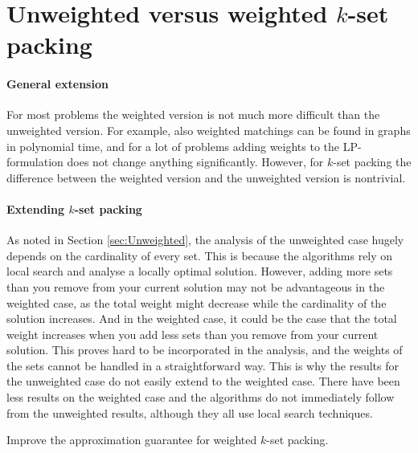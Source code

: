 \section{Unweighted versus weighted $k$-set packing}\label{sec:WeightedVSUnweighted}

\paragraph{General extension} For most problems the weighted version is not much more difficult than the unweighted version. For example, also weighted matchings can be found in graphs in polynomial time, and for a lot of problems adding weights to the LP-formulation does not change anything significantly. However, for $k$-set packing the difference between the weighted version and the unweighted version is nontrivial.

\paragraph{Extending $k$-set packing} As noted in Section \ref{sec:Unweighted}, the analysis of the unweighted case hugely depends on the cardinality of every set. This is because the algorithms rely on local search and analyse a locally optimal solution. However, adding more sets than you remove from your current solution may not be advantageous in the weighted case, as the total weight might decrease while the cardinality of the solution increases. And in the weighted case, it could be the case that the total weight increases when you add less sets than you remove from your current solution. This proves hard to be incorporated in the analysis, and the weights of the sets cannot be handled in a straightforward way. This is why the results for the unweighted case do not easily extend to the weighted case. There have been less results on the weighted case and the algorithms do not immediately follow from the unweighted results, although they all use local search techniques.

\begin{prob}
Improve the approximation guarantee for weighted $k$-set packing.
\end{prob}

